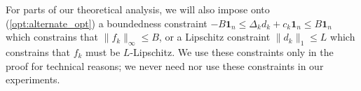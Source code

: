 \begin{remark}
\label{rem:bounded_lipschitz_constraints}
For parts of our theoretical analysis, we will also impose onto (\ref{opt:alternate_opt}) a boundedness constraint $-B \mathbf{1}_n \leq \Delta_k d_k + c_k \mathbf{1}_n \leq B \mathbf{1}_n$ which constrains that $\|f_k \|_\infty \leq B$, or a Lipschitz constraint $\|d_k\|_1 \leq L$ which constrains that $f_k$ must be $L$-Lipschitz. We use these constraints only in the proof for technical reasons; we never need nor use these constraints in our experiments.
\end{remark}


